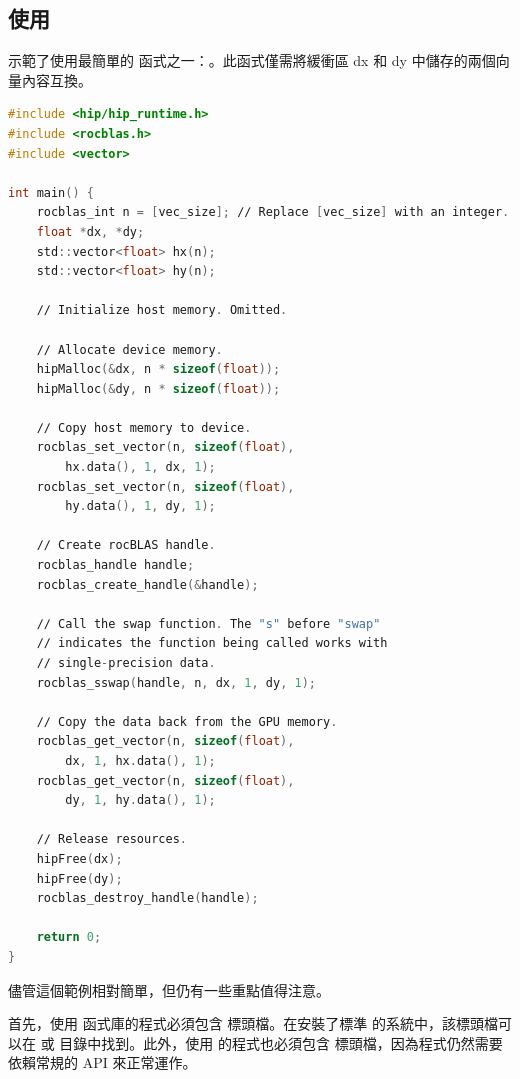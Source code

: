 \subsection{使用 }
 示範了使用最簡單的  函式之一：。此函式僅需將緩衝區 dx 和 dy 中儲存的兩個向量內容互換。

\begin{lstlisting}[language=C, caption={\term{rocBLAS} 函式庫範例。為簡化起見，錯誤處理程式碼已省略。}, captionpos=t, label={lst:rocBLAS}]
#include <hip∕hip_runtime.h>
#include <rocblas.h>
#include <vector>

int main() {
    rocblas_int n = [vec_size]; ∕∕ Replace [vec_size] with an integer.
    float *dx, *dy;
    std::vector<float> hx(n);
    std::vector<float> hy(n);

    ∕∕ Initialize host memory. Omitted.

    ∕∕ Allocate device memory.
    hipMalloc(&dx, n * sizeof(float));
    hipMalloc(&dy, n * sizeof(float));

    ∕∕ Copy host memory to device.
    rocblas_set_vector(n, sizeof(float),
        hx.data(), 1, dx, 1);
    rocblas_set_vector(n, sizeof(float),
        hy.data(), 1, dy, 1);

    ∕∕ Create rocBLAS handle.
    rocblas_handle handle;
    rocblas_create_handle(&handle);

    ∕∕ Call the swap function. The "s" before "swap"
    ∕∕ indicates the function being called works with
    ∕∕ single-precision data.
    rocblas_sswap(handle, n, dx, 1, dy, 1);

    ∕∕ Copy the data back from the GPU memory.
    rocblas_get_vector(n, sizeof(float),
        dx, 1, hx.data(), 1);
    rocblas_get_vector(n, sizeof(float),
        dy, 1, hy.data(), 1);

    ∕∕ Release resources.
    hipFree(dx);
    hipFree(dy);
    rocblas_destroy_handle(handle);

    return 0;
}
\end{lstlisting}

儘管這個範例相對簡單，但仍有一些重點值得注意。

首先，使用  函式庫的程式必須包含  標頭檔。在安裝了標準  的系統中，該標頭檔可以在  或  目錄中找到。此外，使用  的程式也必須包含  標頭檔，因為程式仍然需要依賴常規的  API 來正常運作。

